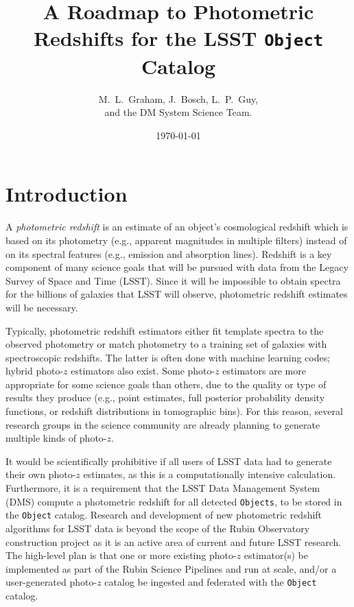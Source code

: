 \documentclass[DM,lsstdraft,toc]{lsstdoc}
\title[Photo-$z$ for LSST Objects]{A Roadmap to Photometric Redshifts for the LSST {\tt Object} Catalog}
\author{M.~L.~Graham, J.~Bosch, L.~P.~Guy, \\ and the DM System Science Team.}
\date{\today}
\begin{document}
\maketitle



\section{Introduction} \label{sec:intro}

A {\it photometric redshift} is an estimate of an object's cosmological redshift which is based on its photometry (e.g., apparent magnitudes in multiple filters) instead of on its spectral features (e.g., emission and absorption lines). 
Redshift is a key component of many science goals that will be pursued with data from the Legacy Survey of Space and Time (LSST).
Since it will be impossible to obtain spectra for the billions of galaxies that LSST will observe, photometric redshift estimates will be necessary.

Typically, photometric redshift estimators either fit template spectra to the observed photometry or match photometry to a training set of galaxies with spectroscopic redshifts. 
The latter is often done with machine learning codes;  hybrid photo-$z$ estimators also exist. 
Some photo-$z$ estimators are more appropriate for some science goals than others, due to the quality or type of results they produce (e.g., point estimates, full posterior probability density functions, or redshift distributions in tomographic bins).
For this reason, several research groups in the science community are already planning to generate multiple kinds of photo-$z$.

It would be scientifically prohibitive if all users of LSST data had to generate their own photo-$z$ estimates, as this is a computationally intensive calculation.
Furthermore, it is a requirement that the LSST Data Management System (DMS) compute a photometric redshift for all detected {\tt Objects}, to be stored in the {\tt Object} catalog. 
Research and development of new photometric redshift algorithms for LSST data is beyond the scope of the Rubin Observatory construction project as it is an active area of current and future LSST research.
The high-level plan is that one or more existing photo-$z$ estimator(s) be implemented as part of the Rubin Science Pipelines and run at scale, and/or a user-generated photo-$z$ catalog be ingested and federated with the {\tt Object} catalog.
\end{document}
